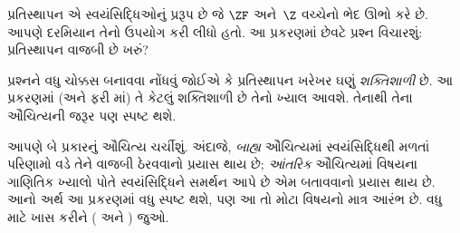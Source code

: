 \documentclass[../../../include/open-logic-section]{subfiles}
\begin{document}

પ્રતિસ્થાપન એ સ્વયંસિદ્ધિઓનું પ્રરૂપ છે જે $\ZF$
અને~$\Z$ વચ્ચેનો ભેદ ઊભો કરે છે. આપણે
 દરમિયાન તેનો
ઉપયોગ કરી લીધો હતો. આ પ્રકરણમાં છેવટે પ્રશ્ન વિચારશું:
પ્રતિસ્થાપન વાજબી છે ખરું?

પ્રશ્નને વધુ ચોક્કસ બનાવવા નોંધવું જોઈએ કે પ્રતિસ્થાપન ખરેખર
ઘણું \emph{શક્તિશાળી} છે. આ પ્રકરણમાં (અને ફરી
માં) તે કેટલું શક્તિશાળી
છે તેનો ખ્યાલ આવશે. તેનાથી તેના ઔચિત્યની જરૂર પણ સ્પષ્ટ થશે.

આપણે બે પ્રકારનું ઔચિત્ય ચર્ચીશું. અંદાજે, \emph{બાહ્ય}
ઔચિત્યમાં સ્વયંસિદ્ધિથી મળતાં પરિણામો વડે તેને વાજબી
ઠેરવવાનો પ્રયાસ થાય છે; \emph{આંતરિક} ઔચિત્યમાં વિષયના
ગાણિતિક ખ્યાલો પોતે સ્વયંસિદ્ધિને સમર્થન આપે છે એમ બતાવવાનો
પ્રયાસ થાય છે. આનો અર્થ આ પ્રકરણમાં વધુ સ્પષ્ટ થશે, પણ આ તો
મોટા વિષયનો માત્ર આરંભ છે. વધુ માટે ખાસ કરીને
\citeauthor{Maddy1988a} (\citeyear{Maddy1988a} અને
\citeyear{Maddy1988b}) જુઓ.
\end{document}
